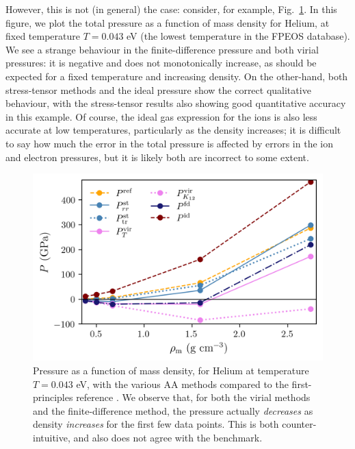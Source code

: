 \documentclass[%
 preprint,
 superscriptaddress,
 amsmath,amssymb,
longbibliography,
]{revtex4-2}
\begin{document}
However, this is not (in general) the case: consider, for example, Fig.~\ref{fig:He_low_T_errs}. In this figure, we plot the total pressure as a function of mass density for Helium, at fixed temperature $T=0.043$ eV (the lowest temperature in the FPEOS database). We see a strange behaviour in the finite-difference pressure and both virial pressures: it is negative and does not monotonically increase, as should be expected for a fixed temperature and increasing density. On the other-hand, both stress-tensor methods and the ideal pressure show the correct qualitative behaviour, with the stress-tensor results also showing good quantitative accuracy in this example. Of course, the ideal gas expression for the ions is also less accurate at low temperatures, particularly as the density increases; it is difficult to say how much the error in the total pressure is affected by errors in the ion and electron pressures, but it is likely both are incorrect to some extent.

\begin{figure}
    \centering
    \includegraphics{../figs/He_low_T_errs.png}
    \caption{Pressure as a function of mass density, for Helium at temperature $T=0.043$ eV, with the various AA methods compared to the first-principles reference \cite{Militzer_EOS_database}. We observe that, for both the virial methods and the finite-difference method, the pressure actually \emph{decreases} as density \emph{increases} for the first few data points. This is both counter-intuitive, and also does not agree with the benchmark.}
    \label{fig:He_low_T_errs}
\end{figure}
\end{document}
